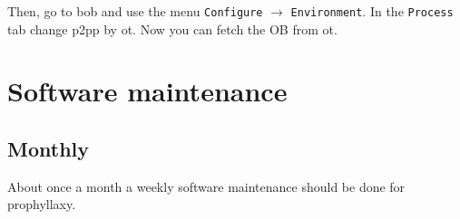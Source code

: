 \documentclass[11pt,fleqn]{book}
\begin{document}
Then, go to \gls{bob} and use the menu \texttt{Configure} $\rightarrow$ \texttt{Environment}. In the \texttt{Process} tab change \gls{p2pp} by \gls{ot}. Now you can fetch the OB from \gls{ot}.




\chapter{Software maintenance}
\label{sec:reboots}

\section{Monthly}

About once a month a weekly software maintenance should be done for prophyllaxy.
\end{document}
